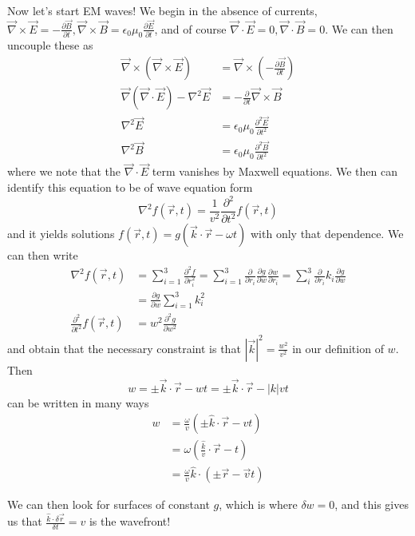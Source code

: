 \documentclass[10pt]{report}
\newcommand{\pd}[2]{\frac{\partial #1}{\partial#2}}
\newcommand{\ptd}[2]{\frac{\partial^2 #1}{\partial#2^2}}
\newcommand{\abs}[1]{\left|#1\right|}
\begin{document}
Now let's start EM waves! We begin in the absence of currents, $\vec{\nabla} \times \vec{E} = -\pd{\vec{B}}{t}, \vec{\nabla} \times \vec{B} = \epsilon_0 \mu_0 \pd{\vec{E}}{t}$, and of course $\vec{\nabla} \cdot \vec{E} = 0, \vec{\nabla} \cdot \vec{B} = 0$. We can then uncouple these as
\begin{align}
    \vec{\nabla} \times \left( \vec{\nabla} \times \vec{E} \right) &= \vec{\nabla} \times \left( -\pd{\vec{B}}{t} \right)\\
    \vec{\nabla}(\vec{\nabla} \cdot \vec{E}) - \nabla^2 \vec{E} &= -\pd{}{t}\vec{\nabla} \times \vec{B}\\
    \nabla^2 \vec{E} &= \epsilon_0 \mu_0 \ptd{\vec{E}}{t}\\
    \nabla^2 \vec{B} &= \epsilon_0 \mu_0 \ptd{\vec{B}}{t}
\end{align}
where we note that the $\vec{\nabla} \cdot \vec{E}$ term vanishes by Maxwell equations. We then can identify this equation to be of wave equation form
\begin{equation}
    \nabla^2 f(\vec{r},t) = \frac{1}{v^2}\ptd{}{t}f(\vec{r},t)
\end{equation}
and it yields solutions $f(\vec{r},t) = g(\vec{k} \cdot \vec{r} - \omega t)$ with only that dependence. We can then write
\begin{align}
    \nabla^2 f(\vec{r},t) &= \sum_{i=1}^{3}\ptd{f}{r_i} = \sum_{i=1}^{3}\pd{}{r_i}\pd{g}{w}\pd{w}{r_i} = \sum_{i}^{3} \pd{}{r_i}k_i\pd{g}{w}\\
    &= \pd{g}{w}\sum_{i=1}^{3}k_i^2\\
    \ptd{}{t}f(\vec{r},t) &= w^2 \ptd{g}{w}
\end{align}
and obtain that the necessary constraint is that $\abs{\vec{k}}^2 = \frac{w^2}{v^2}$ in our definition of $w$. Then
\begin{equation}
    w = \pm \vec{k} \cdot \vec{r} - wt = \pm \vec{k} \cdot \vec{r} - \abs{k} vt
\end{equation}
can be written in many ways
\begin{align}
    w &= \frac{\omega}{v}\left( \pm \hat{k} \cdot \vec{r} - vt \right)\\
    &= \omega\left( \frac{\hat{k}}{v}\cdot \vec{r} - t \right)\\
    &= \frac{\omega}{v}\hat{k} \cdot \left( \pm \vec{r} - \vec{v}t \right)
\end{align}

We can then look for surfaces of constant $g$, which is where $\delta w = 0$, and this gives us that $\frac{\hat{k} \cdot \delta \vec{r}}{\delta t} = v$ is the wavefront!
\end{document}
